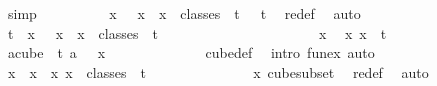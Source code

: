 \begin{isabellebody}
\ simp\isanewline
\ \ \ \ \ \ \ \ \isamarkupfalse%
\ {\isachardoublequoteopen}{\isacharbraceleft}{\kern0pt}x\ {}\ {\isacharbar}{\kern0pt}\ x\ {\isachardot}{\kern0pt}\ x\ {\isasymin}\ classes\ {}\ t\ {}{\isacharbraceright}{\kern0pt}\ {\isasymsubseteq}\ {\isacharbraceleft}{\kern0pt}{\isachardot}{\kern0pt}{\isachardot}{\kern0pt}{\isacharless}{\kern0pt}t{\isacharbraceright}{\kern0pt}{\isachardoublequoteclose}\ \isamarkupfalse%
\ redef\ \isamarkupfalse%
\ auto\isanewline
\ \ \ \ \ \ \ \ \isamarkupfalse%
\ \isamarkupfalse%
\ {\isachardoublequoteopen}{\isacharbraceleft}{\kern0pt}{\isachardot}{\kern0pt}{\isachardot}{\kern0pt}{\isacharless}{\kern0pt}t{\isacharbraceright}{\kern0pt}\ {\isasymsubseteq}\ {\isacharbraceleft}{\kern0pt}x\ {}\ {\isacharbar}{\kern0pt}\ x\ {\isachardot}{\kern0pt}\ x\ {\isasymin}\ classes\ {}\ t\ {}{\isacharbraceright}{\kern0pt}{\isachardoublequoteclose}\ \isanewline
\ \ \ \ \ \ \ \ \isamarkupfalse%
\isanewline
\ \ \ \ \ \ \ \ \ \ \isamarkupfalse%
\ x\ \isamarkupfalse%
\ x{\isacharcolon}{\kern0pt}\ {\isachardoublequoteopen}x\ {\isasymin}\ {\isacharbraceleft}{\kern0pt}{\isachardot}{\kern0pt}{\isachardot}{\kern0pt}{\isacharless}{\kern0pt}t{\isacharbraceright}{\kern0pt}{\isachardoublequoteclose}\isanewline
\ \ \ \ \ \ \ \ \ \ \isamarkupfalse%
\ {\isachardoublequoteopen}{\isasymexists}a{\isasymin}cube\ {}\ t{\isachardot}{\kern0pt}\ a\ {}\ {\isacharequal}{\kern0pt}\ x{\isachardoublequoteclose}\isanewline
\ \ \ \ \ \ \ \ \ \ \ \ \isamarkupfalse%
\ cube{\isacharunderscore}{\kern0pt}def\ \isamarkupfalse%
\ {\isacharparenleft}{\kern0pt}intro\ fun{\isacharunderscore}{\kern0pt}ex{\isacharparenright}{\kern0pt}\ auto\isanewline
\ \ \ \ \ \ \ \ \ \ \isamarkupfalse%
\ \isamarkupfalse%
\ {\isachardoublequoteopen}x\ {\isasymin}\ {\isacharbraceleft}{\kern0pt}x\ {}\ {\isacharbar}{\kern0pt}x{\isachardot}{\kern0pt}\ x\ {\isasymin}\ classes\ {}\ t\ {}{\isacharbraceright}{\kern0pt}{\isachardoublequoteclose}\isanewline
\ \ \ \ \ \ \ \ \ \ \ \ \isamarkupfalse%
\ x\ cube{\isacharunderscore}{\kern0pt}subset\ \isamarkupfalse%
\ redef\ \isamarkupfalse%
\ auto\isanewline
\ \ \ \ \ \ \ \ \isamarkupfalse%
\isanewline
\ \ \ \ \ \ \ \ \isamarkupfalse%

\end{isabellebody}
